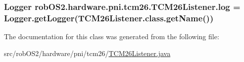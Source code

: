 \label{classrob_o_s2_1_1hardware_1_1pni_1_1tcm26_1_1_t_c_m26_listener_a96d39b4f970f57184582df5d8d439a38}
\hypertarget{classrob_o_s2_1_1hardware_1_1pni_1_1tcm26_1_1_t_c_m26_listener_a05a5a1830d9d0d14a9a6e9f058ce8baf}{
\subsubsection[{log}]{\setlength{\rightskip}{0pt plus 5cm}Logger {\bf robOS2.hardware.pni.tcm26.TCM26Listener.log} = Logger.getLogger(TCM26Listener.class.getName())}}
\label{classrob_o_s2_1_1hardware_1_1pni_1_1tcm26_1_1_t_c_m26_listener_a05a5a1830d9d0d14a9a6e9f058ce8baf}


The documentation for this class was generated from the following file:\begin{DoxyCompactItemize}
\item 
src/robOS2/hardware/pni/tcm26/\hyperlink{_t_c_m26_listener_8java}{TCM26Listener.java}\end{DoxyCompactItemize}
